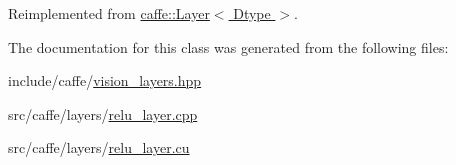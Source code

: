 Reimplemented from \hyperlink{classcaffe_1_1_layer_a2d78dbf5d8bc36928bd8f6fcfbafbcef}{caffe\+::\+Layer$<$ Dtype $>$}.



The documentation for this class was generated from the following files\+:\begin{DoxyCompactItemize}
\item 
include/caffe/\hyperlink{vision__layers_8hpp}{vision\+\_\+layers.\+hpp}\item 
src/caffe/layers/\hyperlink{relu__layer_8cpp}{relu\+\_\+layer.\+cpp}\item 
src/caffe/layers/\hyperlink{relu__layer_8cu}{relu\+\_\+layer.\+cu}\end{DoxyCompactItemize}
